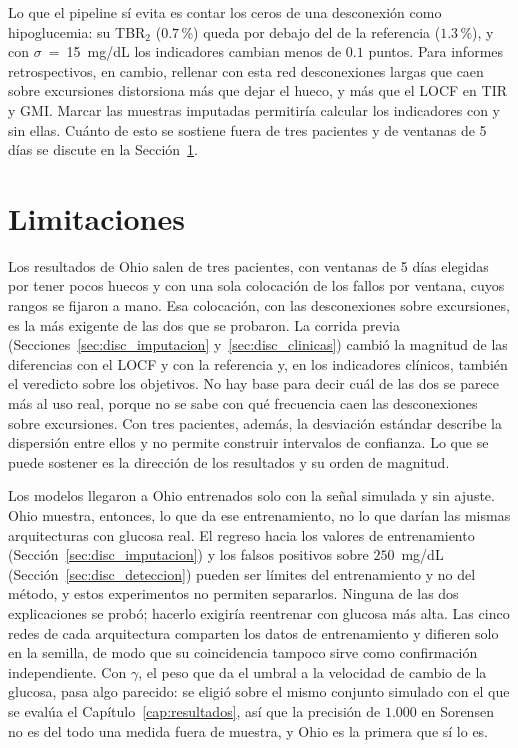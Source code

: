 \documentclass{report}
\begin{document}
Lo que el pipeline sí evita es contar los ceros de una desconexión como hipoglucemia: su TBR$_2$ ($0.7$\,\%) queda por debajo del de la referencia ($1.3$\,\%), y con $\sigma$~=~15~mg/dL los indicadores cambian menos de $0.1$ puntos. Para informes retrospectivos, en cambio, rellenar con esta red desconexiones largas que caen sobre excursiones distorsiona más que dejar el hueco, y más que el LOCF en TIR y GMI. Marcar las muestras imputadas permitiría calcular los indicadores con y sin ellas. Cuánto de esto se sostiene fuera de tres pacientes y de ventanas de 5 días se discute en la Sección~\ref{sec:disc_limitaciones}.

\section{Limitaciones}
\label{sec:disc_limitaciones}

Los resultados de Ohio salen de tres pacientes, con ventanas de 5 días elegidas por tener pocos huecos y con una sola colocación de los fallos por ventana, cuyos rangos se fijaron a mano. Esa colocación, con las desconexiones sobre excursiones, es la más exigente de las dos que se probaron. La corrida previa (Secciones~\ref{sec:disc_imputacion} y~\ref{sec:disc_clinicas}) cambió la magnitud de las diferencias con el LOCF y con la referencia y, en los indicadores clínicos, también el veredicto sobre los objetivos. No hay base para decir cuál de las dos se parece más al uso real, porque no se sabe con qué frecuencia caen las desconexiones sobre excursiones. Con tres pacientes, además, la desviación estándar describe la dispersión entre ellos y no permite construir intervalos de confianza. Lo que se puede sostener es la dirección de los resultados y su orden de magnitud.

Los modelos llegaron a Ohio entrenados solo con la señal simulada y sin ajuste. Ohio muestra, entonces, lo que da ese entrenamiento, no lo que darían las mismas arquitecturas con glucosa real. El regreso hacia los valores de entrenamiento (Sección~\ref{sec:disc_imputacion}) y los falsos positivos sobre $250$~mg/dL (Sección~\ref{sec:disc_deteccion}) pueden ser límites del entrenamiento y no del método, y estos experimentos no permiten separarlos. Ninguna de las dos explicaciones se probó; hacerlo exigiría reentrenar con glucosa más alta. Las cinco redes de cada arquitectura comparten los datos de entrenamiento y difieren solo en la semilla, de modo que su coincidencia tampoco sirve como confirmación independiente. Con $\gamma$, el peso que da el umbral a la velocidad de cambio de la glucosa, pasa algo parecido: se eligió sobre el mismo conjunto simulado con el que se evalúa el Capítulo~\ref{cap:resultados}, así que la precisión de $1.000$ en Sorensen no es del todo una medida fuera de muestra, y Ohio es la primera que sí lo es.
\end{document}
